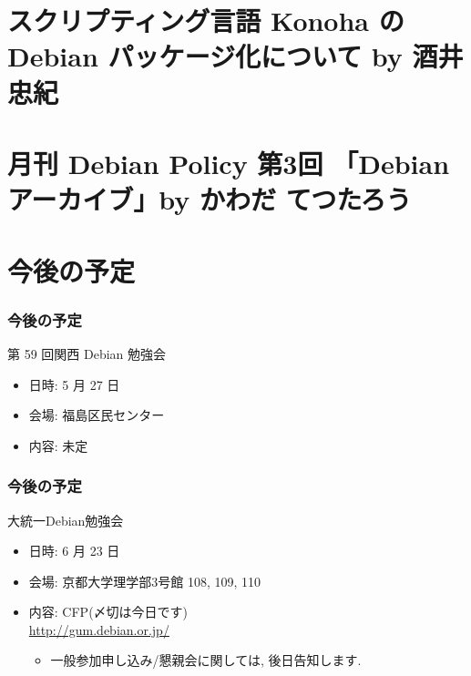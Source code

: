 \documentclass[cjk,dvipdfmx,10pt,%
hyperref={bookmarks=true,bookmarksnumbered=true,bookmarksopen=false,%
colorlinks=false,%
pdftitle={第 58 回 関西 Debian 勉強会},%
pdfauthor={倉敷・のがた・河田・佐々木},%
pdfsubject={資料},%
}]{beamer}
\begin{document}
\section{スクリプティング言語 Konoha の Debian パッケージ化について by 酒井 忠紀}


\section{月刊 Debian Policy 第3回 「Debian アーカイブ」by かわだ てつたろう}



\section{今後の予定}
\begin{frame}[fragile]
\frametitle{今後の予定}

\begin{block}{第 59 回関西 Debian 勉強会}
\begin{itemize}
  \item 日時: 5 月 27 日
  \item 会場: 福島区民センター
  \item 内容: 未定
\end{itemize}
\end{block}

\end{frame}

\begin{frame}[fragile]
\frametitle{今後の予定}

\begin{block}{大統一Debian勉強会}
\begin{itemize}
  \item 日時: 6 月 23 日
  \item 会場: 京都大学理学部3号館 108, 109, 110
  \item 内容: CFP(〆切は今日です) \\
    \url{http://gum.debian.or.jp/}
    \begin{itemize}
    \item 一般参加申し込み/懇親会に関しては, 後日告知します.
    \end{itemize}
\end{itemize}
\end{block}

\end{frame}



\takahashi[50]{  }
\end{document}
